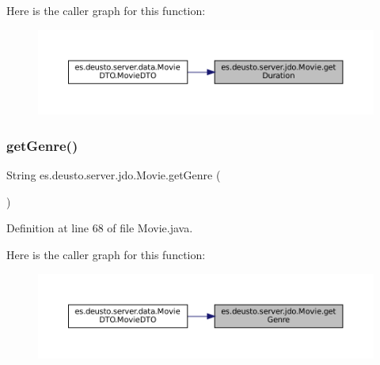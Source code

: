 Here is the caller graph for this function\+:
\nopagebreak
\begin{figure}[H]
\begin{center}
\leavevmode
\includegraphics[width=350pt]{classes_1_1deusto_1_1server_1_1jdo_1_1_movie_a3c056812ade3ddfa59723e5181c90206_icgraph}
\end{center}
\end{figure}
\mbox{\label{classes_1_1deusto_1_1server_1_1jdo_1_1_movie_a5505376d4003bcfa7603fc1a707e2528}} 
\subsubsection{\texorpdfstring{getGenre()}{getGenre()}}
{\footnotesize\ttfamily String es.\+deusto.\+server.\+jdo.\+Movie.\+get\+Genre (\begin{DoxyParamCaption}{ }\end{DoxyParamCaption})}



Definition at line 68 of file Movie.\+java.

Here is the caller graph for this function\+:
\nopagebreak
\begin{figure}[H]
\begin{center}
\leavevmode
\includegraphics[width=350pt]{classes_1_1deusto_1_1server_1_1jdo_1_1_movie_a5505376d4003bcfa7603fc1a707e2528_icgraph}
\end{center}
\end{figure}
\mbox{\label{classes_1_1deusto_1_1server_1_1jdo_1_1_movie_a4d2758ed2b7a03bd95646f67c046e043}} 
